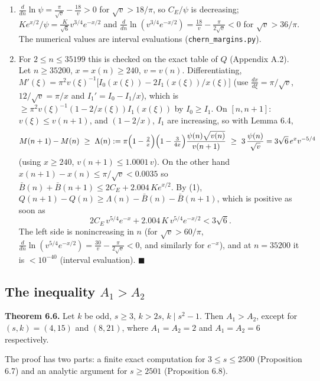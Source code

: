\begin{enumerate}
\def\labelenumi{(\arabic{enumi})}
\setcounter{enumi}{1}
\item
  \(\frac{d}{dn}\ln\psi=\frac{\pi}{\sqrt v}-\frac{18}{v}>0\) for \(\sqrt v>18/\pi\), so \(C_E/\psi\) is decreasing; \(Ke^{x/2}/\psi=\frac K{\sqrt6}v^{3/4}e^{-x/2}\) and \(\frac d{dn}\ln(v^{3/4}e^{-x/2})=\frac{18}{v}-\frac\pi{2\sqrt v}<0\) for \(\sqrt v>36/\pi\). The numerical values are interval evaluations (\texttt{chern\_margins.py}).
\item
  For \(2\le n\le35199\) this is checked on the exact table of \(Q\) (Appendix A.2). Let \(n\ge35200\), \(x=x(n)\ge240\), \(v=v(n)\). Differentiating, \(M'(\xi)=\pi^2v(\xi)^{-1}\bigl[I_0(x(\xi))-2I_1(x(\xi))/x(\xi)\bigr]\) (use \(\frac{dx}{d\xi}=\pi/\sqrt{v}\), \(12/\sqrt v=\pi/x\) and \(I_1'=I_0-I_1/x\)), which is \(\ge\pi^2v(\xi)^{-1}(1-2/x(\xi))I_1(x(\xi))\) by \(I_0\ge I_1\). On \([n,n+1]\): \(v(\xi)\le v(n+1)\), and \((1-2/x)\), \(I_1\) are increasing, so with Lemma 6.4,
  \[M(n+1)-M(n)\ \ge\ \Lambda(n):=\pi\Bigl(1-\tfrac2x\Bigr)\Bigl(1-\tfrac3{4x}\Bigr)\frac{\psi(n)\sqrt{v(n)}}{v(n+1)}\ \ge\ 3\,\frac{\psi(n)}{\sqrt{v}}=3\sqrt6\,e^{x}v^{-5/4}\]
  (using \(x\ge240\), \(v(n+1)\le1.0001\,v\)). On the other hand \(x(n+1)-x(n)\le\pi/\sqrt v<0.0035\) so \(\bar B(n)+\bar B(n+1)\le2C_E+2.004\,Ke^{x/2}\). By (1), \(Q(n+1)-Q(n)\ge\Lambda(n)-\bar B(n)-\bar B(n+1)\), which is positive as soon as
  \[2C_E\,v^{5/4}e^{-x}+2.004\,K\,v^{5/4}e^{-x/2}<3\sqrt6 .\]
  The left side is nonincreasing in \(n\) (for \(\sqrt v>60/\pi\), \(\frac d{dn}\ln(v^{5/4}e^{-x/2})=\frac{30}v-\frac{\pi}{2\sqrt v}<0\), and similarly for \(e^{-x}\)), and at \(n=35200\) it is \(<10^{-40}\) (interval evaluation). \(\blacksquare\)
\end{enumerate}

\subsection{\texorpdfstring{The inequality \(A_1>A_2\)}{The inequality A\_1\textgreater A\_2}}\label{the-inequality-a_1a_2}

\textbf{Theorem 6.6.} Let \(k\) be odd, \(s\ge3\), \(k>2s\), \(k\mid s^2-1\). Then \(A_1>A_2\), except for \((s,k)=(4,15)\) and \((8,21)\), where \(A_1=A_2=2\) and \(A_1=A_2=6\) respectively.

The proof has two parts: a finite exact computation for \(3\le s\le2500\) (Proposition 6.7) and an analytic argument for \(s\ge2501\) (Proposition 6.8).

